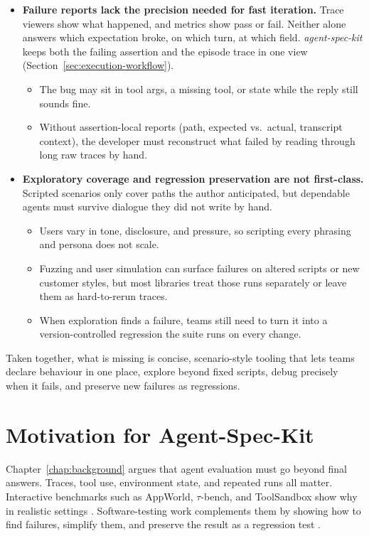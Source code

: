 \begin{itemize}
    \item \textbf{Failure reports lack the precision needed for fast iteration.}
    Trace viewers show what happened, and metrics show pass or fail. Neither alone answers which expectation broke, on which turn, at which field. \emph{agent-spec-kit} keeps both the failing assertion and the episode trace in one view (Section~\ref{sec:execution-workflow}).
    \begin{itemize}
        \item The bug may sit in tool args, a missing tool, or state while the reply still sounds fine.
        \item Without assertion-local reports (path, expected vs.\ actual, transcript context), the developer must reconstruct what failed by reading through long raw traces by hand.
    \end{itemize}

    \item \textbf{Exploratory coverage and regression preservation are not first-class.}
    Scripted scenarios only cover paths the author anticipated, but dependable agents must survive dialogue they did not write by hand.
    \begin{itemize}
        \item Users vary in tone, disclosure, and pressure, so scripting every phrasing and persona does not scale.
        \item Fuzzing and user simulation can surface failures on altered scripts or new customer styles, but most libraries treat those runs separately or leave them as hard-to-rerun traces.
        \item When exploration finds a failure, teams still need to turn it into a version-controlled regression the suite runs on every change.
    \end{itemize}
\end{itemize}

Taken together, what is missing is concise, scenario-style tooling that lets teams declare behaviour in one place, explore beyond fixed scripts, debug precisely when it fails, and preserve new failures as regressions.

\section{Motivation for Agent-Spec-Kit}
\label{sec:agent-spec-kit-motivation}

Chapter~\ref{chap:background} argues that agent evaluation must go beyond final answers. Traces, tool use, environment state, and repeated runs all matter. Interactive benchmarks such as AppWorld, $\tau$-bench, and ToolSandbox show why in realistic settings \citep{trivedi2024appworld,yao2024taubench,lu2024toolsandbox}. Software-testing work complements them by showing how to find failures, simplify them, and preserve the result as a regression test \citep{claessen2000quickcheck,zeller2002simplifying}.

